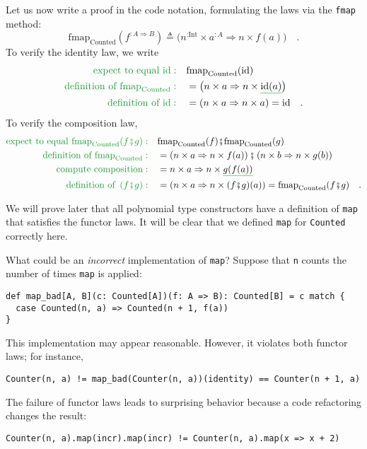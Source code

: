 Let us now write a proof in the code notation, formulating the laws
via the \lstinline!fmap! method:
\[
\text{fmap}_{\text{Counted}}(f^{:A\Rightarrow B})\triangleq\big(n^{:\text{Int}}\times a^{:A}\Rightarrow n\times f(a)\big)\quad.
\]
To verify the identity law, we write
\begin{align*}
{\color{greenunder}\text{expect to equal }\text{id}:}\quad & \text{fmap}_{\text{Counted}}(\text{id})\\
{\color{greenunder}\text{definition of }\text{fmap}_{\text{Counted}}:}\quad & =\big(n\times a\Rightarrow n\times\gunderline{\text{id}(a)}\big)\\
{\color{greenunder}\text{definition of }\text{id}:}\quad & =\left(n\times a\Rightarrow n\times a\right)=\text{id}\quad.
\end{align*}
To verify the composition law,
\begin{align*}
{\color{greenunder}\text{expect to equal }\text{fmap}_{\text{Counted}}(f\bef g):}\quad & \text{fmap}_{\text{Counted}}(f)\bef\text{fmap}_{\text{Counted}}(g)\\
{\color{greenunder}\text{definition of }\text{fmap}_{\text{Counted}}:}\quad & =\left(n\times a\Rightarrow n\times f(a)\right)\bef\left(n\times b\Rightarrow n\times g(b)\right)\\
{\color{greenunder}\text{compute composition}:}\quad & =n\times a\Rightarrow n\times\gunderline{g(f(a))}\\
{\color{greenunder}\text{definition of }\left(f\bef g\right):}\quad & =\left(n\times a\Rightarrow n\times(f\bef g)(a)\right)=\text{fmap}_{\text{Counted}}(f\bef g)\quad.
\end{align*}

We will prove later that all polynomial type constructors have a definition
of \lstinline!map! that satisfies the functor laws. It will be clear
that we defined \lstinline!map! for \lstinline!Counted! correctly
here. 

What could be an \emph{incorrect} implementation of \lstinline!map!?
Suppose that \lstinline!n! counts the number of times \lstinline!map!
is applied:
\begin{lstlisting}
def map_bad[A, B](c: Counted[A])(f: A => B): Counted[B] = c match {
  case Counted(n, a) => Counted(n + 1, f(a))
}
\end{lstlisting}
This implementation may appear reasonable. However, it violates both
functor laws; for instance,
\begin{lstlisting}
Counter(n, a) != map_bad(Counter(n, a))(identity) == Counter(n + 1, a)
\end{lstlisting}
The failure of functor laws leads to surprising behavior because a
code refactoring changes the result:
\begin{lstlisting}
Counter(n, a).map(incr).map(incr) != Counter(n, a).map(x => x + 2)
\end{lstlisting}

